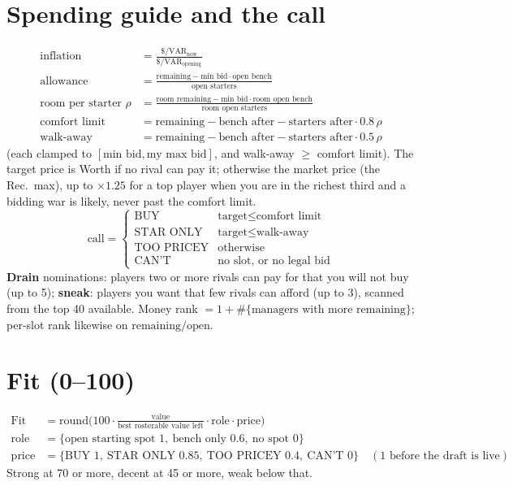 \documentclass[10pt]{article}
\begin{document}
\section{Spending guide and the call}
\begin{align}
\text{inflation} &= \frac{\$/\mathrm{VAR}_{\text{now}}}{\$/\mathrm{VAR}_{\text{opening}}}\\
\text{allowance} &= \frac{\text{remaining}-\text{min bid}\cdot\text{open bench}}{\text{open starters}}\\
\text{room per starter } \rho &= \frac{\text{room remaining}-\text{min bid}\cdot\text{room open bench}}{\text{room open starters}}\\
\text{comfort limit} &= \text{remaining}-\text{bench after}-\text{starters after}\cdot 0.8\,\rho\\
\text{walk-away} &= \text{remaining}-\text{bench after}-\text{starters after}\cdot 0.5\,\rho
\end{align}
(each clamped to $[\text{min bid},\text{my max bid}]$, and walk-away $\ge$ comfort limit). The target price is Worth if no rival can
pay it; otherwise the market price (the Rec.\ max), up to $\times 1.25$ for a top player when you are in the richest third and
a bidding war is likely, never past the comfort limit.
\[
\text{call}=\begin{cases}\text{BUY}&\text{target}\le\text{comfort limit}\\ \text{STAR ONLY}&\text{target}\le\text{walk-away}\\ \text{TOO PRICEY}&\text{otherwise}\\ \text{CAN'T}&\text{no slot, or no legal bid}\end{cases}
\]
\textbf{Drain} nominations: players two or more rivals can pay for that you will not buy (up to 5); \textbf{sneak}: players
you want that few rivals can afford (up to 3), scanned from the top 40 available.
Money rank $=1+\#\{\text{managers with more remaining}\}$; per-slot rank likewise on $\text{remaining}/\text{open}$.

\section{Fit (0--100)}
\begin{align}
\text{Fit} &= \mathrm{round}\!\Big(100\cdot\frac{\text{value}}{\text{best rosterable value left}}\cdot \text{role}\cdot\text{price}\Big)\\
\text{role}&=\{\text{open starting spot }1,\ \text{bench only }0.6,\ \text{no spot }0\}\\
\text{price}&=\{\text{BUY }1,\ \text{STAR ONLY }0.85,\ \text{TOO PRICEY }0.4,\ \text{CAN'T }0\}\quad(1\text{ before the draft is live})
\end{align}
Strong at 70 or more, decent at 45 or more, weak below that.
\end{document}
